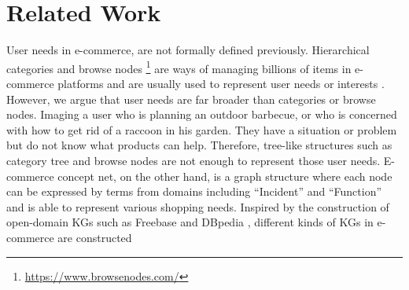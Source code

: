 \section{Related Work}
\label{sec:related}



User needs in e-commerce, are not formally defined previously.
Hierarchical categories and browse nodes \footnote{\url{https://www.browsenodes.com/}} are ways of managing billions of items in e-commerce platforms
and are usually used to represent user needs or interests \cite{zhou2018deep, zhou2018deep2, feng2019deep}.
However, we argue that user needs are far broader than categories or browse nodes. Imaging a user who is planning an outdoor barbecue, or who is concerned with how to get rid of a raccoon in his garden.
They have a situation or problem but do not know what products can help.
Therefore, tree-like structures such as category tree and browse nodes are not enough to represent those user needs.
E-commerce concept net, on the other hand, is a graph structure where each node can be expressed by terms from domains including ``Incident'' and ``Function'' and is able to represent various shopping needs.
Inspired by the construction of open-domain KGs such as Freebase \cite{bollacker2008freebase} and DBpedia \cite{auer2007dbpedia}, different kinds of KGs in e-commerce are constructed
